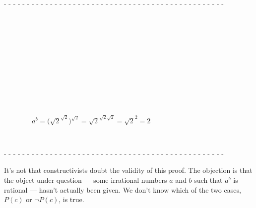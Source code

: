 \documentclass[oneside,12pt]{article}
\begin{document}
\begin{center}
- - - - - - - - - - - - - - - - - - - - - - - - - - - - - - - - - - - - - - - - - - - - - - - -
\end{center}


{\small

\vspace{-0.5em}


\vspace{0.5em}




\vspace{0.5em}


$\qquad \qquad$

$\qquad \qquad$

$\qquad \qquad$



$\qquad \qquad$

$\qquad \qquad$

$\qquad \qquad$

$\qquad \qquad a^{b} = \bigl(\sqrt{2}^{\sqrt{2}}\bigr)^{\sqrt{2}} = \sqrt{2}^{\sqrt{2} \sqrt{2}} = \sqrt{2}^{2} = 2$

$\qquad \qquad$

\vspace{0.5em}


}

\begin{center}
- - - - - - - - - - - - - - - - - - - - - - - - - - - - - - - - - - - - - - - - - - - - - - - -
\end{center}


It's not that constructivists doubt the validity of this proof. The objection is that the object under question --- some irrational numbers $a$ and $b$ such that $a^b$ is rational --- hasn't actually been given. We don't know which of the two cases, $P(c)$ or $\neg P(c)$, is true.
\end{document}
